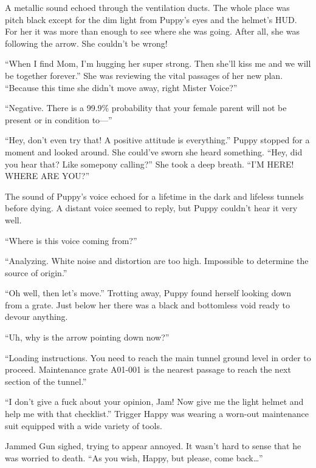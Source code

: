\horizonline


A metallic sound echoed through the ventilation ducts. The whole place was pitch black except for the dim light from Puppy's eyes and the helmet's HUD. For her it was more than enough to see where she was going. After all, she was following the arrow. She couldn't be wrong!

``When I find Mom, I'm hugging her super strong. Then she'll kiss me and we will be together forever.'' She was reviewing the vital passages of her new plan. ``Because this time she didn't move away, right Mister Voice?''

{\mt ``Negative. There is a 99.9\% probability that your female parent will not be present or in condition to---''}

``Hey, don't even try that! A positive attitude is everything.'' Puppy stopped for a moment and looked around. She could've sworn she heard something. ``Hey, did you hear that? Like somepony calling?'' She took a deep breath. ``I'M HERE! WHERE ARE YOU?''

The sound of Puppy's voice echoed for a lifetime in the dark and lifeless tunnels before dying. A distant voice seemed to reply, but Puppy couldn't hear it very well.

``Where is this voice coming from?''

{\mt ``Analyzing. White noise and distortion are too high. Impossible to determine the source of origin.''}

``Oh well, then let's move.'' Trotting away, Puppy found herself looking down from a grate. Just below her there was a black and bottomless void ready to devour anything.

``Uh, why is the arrow pointing down now?''

{\mt ``Loading instructions. You need to reach the main tunnel ground level in order to proceed. Maintenance grate A01-001 is the nearest passage to reach the next section of the tunnel.''}


\horizonline


``I don't give a fuck about your opinion, Jam! Now give me the light helmet and help me with that checklist.'' Trigger Happy was wearing a worn-out maintenance suit equipped with a wide variety of tools.

Jammed Gun sighed, trying to appear annoyed. It wasn't hard to sense that he was worried to death. ``As you wish, Happy, but please, come back\dots''

